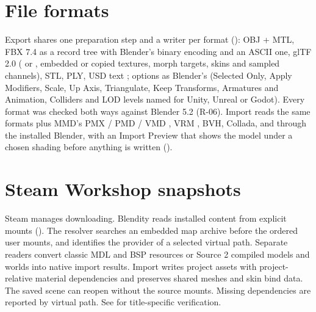 \section{File formats}
Export shares one preparation step and a writer per format (): OBJ + MTL, FBX 7.4 as a
record tree with Blender's binary encoding \cite{FBXBlender2026} and an ASCII one, glTF 2.0 ( or
, embedded or copied textures, morph targets, skins and sampled channels), STL, PLY, USD text
\cite{USD2026}; options as Blender's (Selected Only, Apply Modifiers, Scale, Up Axis, Triangulate, Keep Transforms,
Armatures and Animation, Colliders and LOD levels named for Unity, Unreal or Godot). Every format was checked both ways
against Blender 5.2 (R-06). Import reads the same formats plus MMD's PMX / PMD / VMD \cite{MMD2026}, VRM
\cite{MToon2026}, BVH, Collada, and  through the installed Blender, with an Import Preview that shows the
model under a chosen shading before anything is written ().

\section{Steam Workshop snapshots}
Steam manages downloading. Blendity reads installed content from explicit mounts (). The resolver
searches an embedded map archive before the ordered user mounts, and identifies the provider of a selected virtual
path. Separate readers convert classic MDL and BSP resources or Source 2 compiled models and worlds into native
import results. Import writes project assets with project-relative material dependencies and preserves shared
meshes and skin bind data. The saved scene can reopen without the source mounts. Missing dependencies are
reported by virtual path. See  for title-specific verification.

